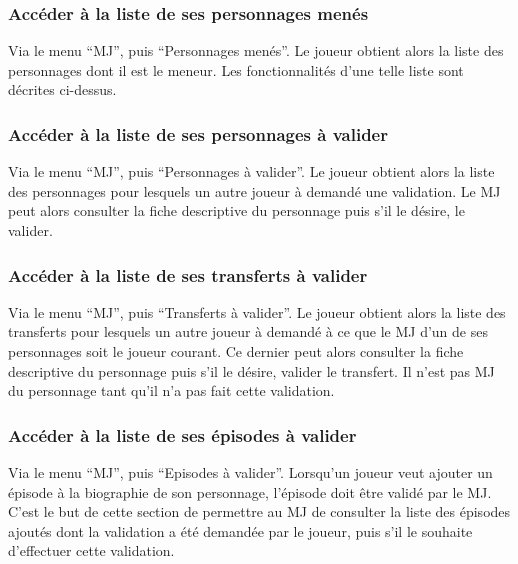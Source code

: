 \documentclass[a4paper, 11pt, titlepage]{article}
\begin{document}
\subsubsection {Accéder à la liste de ses personnages menés}

Via le menu “MJ”, puis “Personnages menés”. Le joueur obtient alors la liste des personnages dont il est le meneur. Les fonctionnalités d’une telle liste sont décrites ci-dessus.

\subsubsection {Accéder à la liste de ses personnages à valider}

Via le menu “MJ”, puis “Personnages à valider”. Le joueur obtient alors la liste des personnages pour lesquels un autre joueur à demandé une validation. Le MJ peut alors consulter la fiche descriptive du personnage puis s’il le désire, le valider.

\subsubsection {Accéder à la liste de ses transferts à valider}

Via le menu “MJ”, puis “Transferts à valider”. Le joueur obtient alors la liste des transferts pour lesquels un autre joueur à demandé à ce que le MJ d’un de ses personnages soit le joueur courant. Ce dernier peut alors consulter la fiche descriptive du personnage puis s’il le désire, valider le transfert. Il n’est pas MJ du personnage tant qu’il n’a pas fait cette validation.

\subsubsection {Accéder à la liste de ses épisodes à valider}

Via le menu “MJ”, puis “Episodes à valider”. Lorsqu'un joueur veut ajouter un épisode à la biographie de son personnage, l’épisode doit être validé par le MJ. C’est le but de cette section de permettre au MJ de consulter la liste des épisodes ajoutés dont la validation a été demandée par le joueur, puis s’il le souhaite d’effectuer cette validation.



\end{document}
